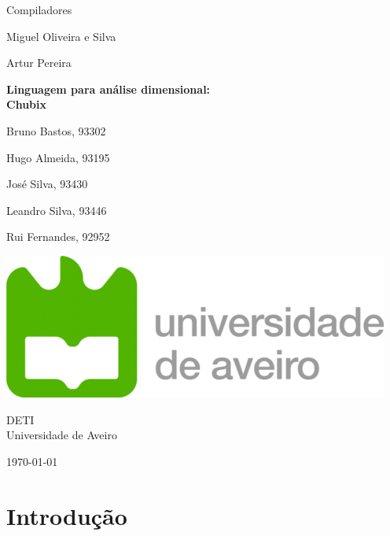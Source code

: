 \documentclass[10pt,portuguese]{article}
\begin{document}
\begin{titlepage}
	\clearpage\thispagestyle{empty}
	\centering
	\vspace{2cm}

	
	{\Large  Compiladores \par}
	\vspace{0.5cm}
	{\small Miguel Oliveira e Silva\par
	Artur Pereira\par}
	\vspace{3cm}
	{\huge \textbf{Linguagem para análise dimensional: \\ Chubix}}
	\vspace{1cm}
	\vspace{4cm}
	{\normalsize  \par Bruno Bastos, 93302 \par 
	Hugo Almeida, 93195 \par
	José Silva, 93430
	\par Leandro Silva, 93446 
	   \par Rui Fernandes, 92952}
	 
	\vspace{2cm}

    \includegraphics[scale=0.20]{images/logo_ua.png}
    
    \vspace{2cm}
    
	{\normalsize DETI \\ 
		Universidade de Aveiro \par}
		
	{\normalsize \today \par}
	\vspace{2cm}
		
	
	\pagebreak

\end{titlepage}
\tableofcontents{}
\clearpage

\section{Introdução}
\end{document}
